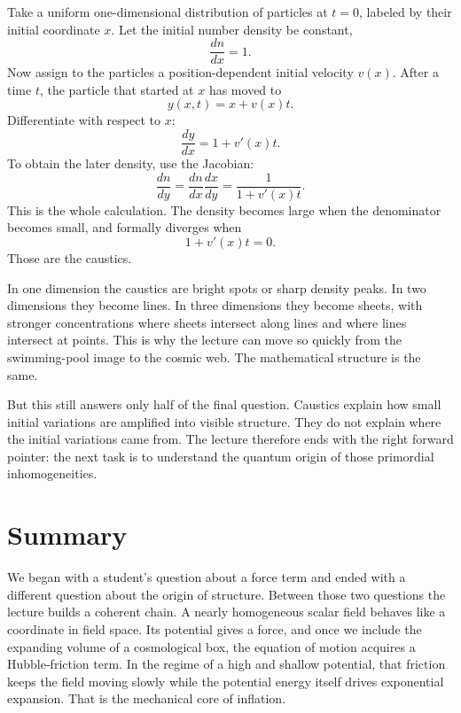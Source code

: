 Take a uniform one-dimensional distribution of particles at \(t=0\), labeled by their initial coordinate \(x\). Let the initial number density be constant,
\begin{equation}
\frac{dn}{dx}=1.
\end{equation}
Now assign to the particles a position-dependent initial velocity \(v(x)\). After a time \(t\), the particle that started at \(x\) has moved to
\begin{equation}
y(x,t)=x+v(x)t.
\end{equation}
Differentiate with respect to \(x\):
\begin{equation}
\frac{dy}{dx}=1+v'(x)t.
\end{equation}
To obtain the later density, use the Jacobian:
\begin{equation}
\frac{dn}{dy}=\frac{dn}{dx}\frac{dx}{dy}
=\frac{1}{1+v'(x)t}.
\end{equation}
This is the whole calculation. The density becomes large when the denominator becomes small, and formally diverges when
\begin{equation}
1+v'(x)t=0.
\end{equation}
Those are the caustics.

In one dimension the caustics are bright spots or sharp density peaks. In two dimensions they become lines. In three dimensions they become sheets, with stronger concentrations where sheets intersect along lines and where lines intersect at points. This is why the lecture can move so quickly from the swimming-pool image to the cosmic web. The mathematical structure is the same.

But this still answers only half of the final question. Caustics explain how small initial variations are amplified into visible structure. They do not explain where the initial variations came from. The lecture therefore ends with the right forward pointer: the next task is to understand the quantum origin of those primordial inhomogeneities.

\section{Summary}

We began with a student's question about a force term and ended with a different question about the origin of structure. Between those two questions the lecture builds a coherent chain. A nearly homogeneous scalar field behaves like a coordinate in field space. Its potential gives a force, and once we include the expanding volume of a cosmological box, the equation of motion acquires a Hubble-friction term. In the regime of a high and shallow potential, that friction keeps the field moving slowly while the potential energy itself drives exponential expansion. That is the mechanical core of inflation.

